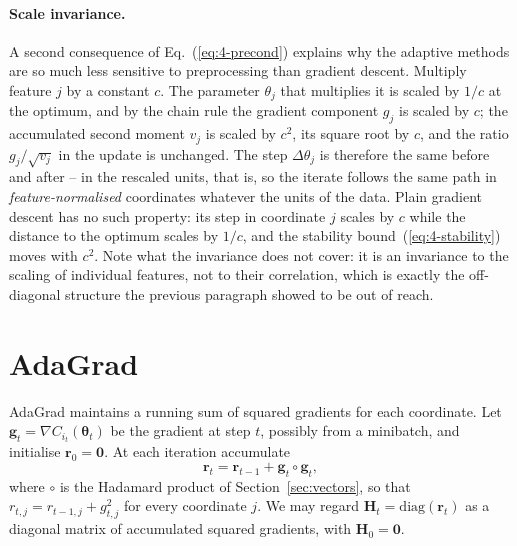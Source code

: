 \paragraph{Scale invariance.}
A second consequence of Eq.~(\ref{eq:4-precond}) explains why the adaptive
methods are so much less sensitive to preprocessing than gradient descent.
Multiply feature $j$ by a constant $c$.  The parameter $\theta_j$ that
multiplies it is scaled by $1/c$ at the optimum, and by the chain rule the
gradient component $g_j$ is scaled by $c$; the accumulated second moment
$v_j$ is scaled by $c^{2}$, its square root by $c$, and the ratio
$g_j/\sqrt{v_j}$ in the update is unchanged.  The step $\Delta\theta_j$ is
therefore the same before and after -- in the rescaled units, that is, so the
iterate follows the same path in \emph{feature-normalised} coordinates
whatever the units of the data.  Plain gradient descent has no such property:
its step in coordinate $j$ scales by $c$ while the distance to the optimum
scales by $1/c$, and the stability bound~(\ref{eq:4-stability}) moves with
$c^{2}$.  Note what the invariance does not cover: it is an invariance to
the scaling of individual features, not to their correlation, which is
exactly the off-diagonal structure the previous paragraph showed to be out
of reach.

\section{AdaGrad}
\label{sec:adagrad}

AdaGrad maintains a running sum of squared gradients for each coordinate.  Let
$\bm{g}_t=\nabla C_{i_t}(\bm{\theta}_t)$ be the gradient at step $t$, possibly
from a minibatch, and initialise $\bm{r}_0=\bm{0}$.  At each iteration
accumulate
\begin{equation}
  \bm{r}_t = \bm{r}_{t-1} + \bm{g}_t\circ\bm{g}_t,
  \label{eq:4-adagradaccum}
\end{equation}
where $\circ$ is the Hadamard product of Section~\ref{sec:vectors}, so that
$r_{t,j}=r_{t-1,j}+g_{t,j}^{2}$ for every coordinate $j$.  We may regard
$\bm{H}_t=\mathrm{diag}(\bm{r}_t)$ as a diagonal matrix of accumulated squared
gradients, with $\bm{H}_0=\bm{0}$.


